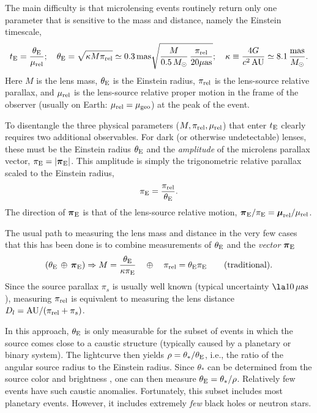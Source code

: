 \documentclass[12pt,preprint]{aastex}
\newcommand{\bdv}[1]{\mbox{\boldmath$#1$}}
\def\au{{\rm AU}}
\def\rel{{\rm rel}}
\def\geo{{\rm geo}}
\def\e{{\rm E}}
\def\bpi{{\bdv\pi}}
\def\bmu{{\bdv\mu}}
\def\muas{{\mu\rm as}}
\begin{document}
The main difficulty is that microlensing events routinely return
only one parameter that is sensitive to the mass and distance, namely
the Einstein timescale, 
\begin{equation}
t_\e = {\theta_\e\over \mu_\rel}; \quad
\theta_\e = \sqrt{\kappa M\pi_\rel} \simeq  0.3\,{\rm mas}
\sqrt{{M\over 0.5\,M_\odot}\,{\pi_\rel\over 20\muas}};
\quad
\kappa \equiv {4 G\over c^2\,\au}\simeq 8.1\,{{\rm mas}\over M_\odot}.
\label{eqn:tedef}
\end{equation}
Here $M$ is the lens mass, $\theta_\e$ is the Einstein radius,
$\pi_\rel$ is the lens-source relative parallax, and $\mu_\rel$
is the lens-source relative proper motion in the frame of the observer
(usually on Earth: $\mu_\rel=\mu_\geo$) at the peak of the event.

To disentangle the three physical parameters ($M,\pi_\rel,\mu_\rel$) 
that enter $t_\e$ clearly requires two additional observables.
For dark (or otherwise undetectable) lenses, these must be
the Einstein radius $\theta_\e$  and the {\it amplitude} of the
microlens parallax vector, $\pi_\e=|\bpi_\e|$.  This amplitude is
simply the trigonometric relative parallax scaled to the Einstein radius,
\begin{equation}
\pi_\e = {\pi_\rel\over\theta_\e}.
\label{eqn:piedef}
\end{equation}
The direction of $\bpi_\e$ is that of the lens-source relative motion,
$\bpi_\e/\pi_\e = \bmu_\rel/\mu_\rel$.

The usual path to measuring the lens mass and distance in the very few cases
that this has been done is to combine measurements of $\theta_\e$
and the {\it vector} $\bpi_\e$
\begin{equation}
(\theta_\e\,\oplus\,\bpi_\e) \Rightarrow M = {\theta_\e\over\kappa\pi_\e}
\quad \oplus \quad \pi_\rel=\theta_\e\pi_\e
\qquad {\rm (traditional)}.
\label{eqn:mdeval}
\end{equation}
Since the source parallax $\pi_s$ is usually well known
(typical uncertainty $\la 10\,\muas$), measuring
$\pi_\rel$ is equivalent to measuring the lens distance 
$D_l =\au/(\pi_\rel + \pi_s)$.

In this approach, $\theta_\e$ is only measurable for the subset of
events in which the source comes close to a caustic structure (typically
caused by a planetary or binary system).  The lightcurve then
yields $\rho=\theta_*/\theta_\e$, i.e., the ratio of the angular source radius
to the Einstein radius.  Since $\theta_*$ can be determined from the source
color and brightness \citep{yoo04}, one can then measure 
$\theta_\e=\theta_*/\rho$.  Relatively few events have such caustic anomalies.
Fortunately, this subset includes most planetary events.  However,
it includes extremely {\it few} black holes or neutron stars.
\end{document}
